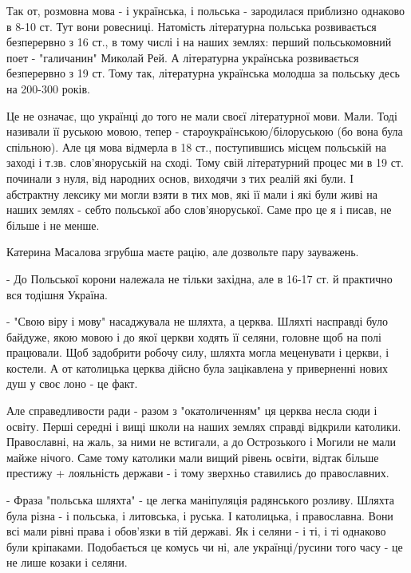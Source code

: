 \begin{itemize}
\begin{itemize}
Так от, розмовна мова - і українська, і польська - зародилася приблизно
однаково в 8-10 ст. Тут вони ровесниці. Натомість літературна польська
розвивається безперервно з 16 ст., в тому числі і на наших землях: перший
польськомовний поет - "галичанин" Миколай Рей. А літературна українська
розвивається безперервно з 19 ст. Тому так, літературна українська молодша за
польську десь на 200-300 років.

Це не означає, що українці до того не мали своєї літературної мови. Мали. Тоді
називали її руською мовою, тепер - староукраїнською/білоруською (бо вона була
спільною). Але ця мова відмерла в 18 ст., поступившись місцем польській на
заході і т.зв. слов'яноруській на сході. Тому свій літературний процес ми в 19
ст. починали з нуля, від народних основ, виходячи з тих реалій які були. І
абстрактну лексику ми могли взяти в тих мов, які її мали і які були живі на
наших землях - себто польської або слов'яноруської. Саме про це я і писав, не
більше і не менше.


 
Катерина Масалова згрубша маєте рацію, але дозвольте пару зауважень.

- До Польської корони належала не тільки західна, але в 16-17 ст. й практично вся тодішня Україна.

- "Свою віру і мову" насаджувала не шляхта, а церква. Шляхті насправді було
байдуже, якою мовою і до якої церкви ходять її селяни, головне щоб на полі
працювали. Щоб задобрити робочу силу, шляхта могла меценувати і церкви, і
костели. А от католицька церква дійсно була зацікавлена у приверненні нових душ
у своє лоно - це факт.

Але справедливости ради - разом з "окатоличенням" ця церква несла сюди і
освіту. Перші середні і вищі школи на наших землях справді відкрили католики.
Православні, на жаль, за ними не встигали, а до Острозького і Могили не мали
майже нічого. Саме тому католики мали вищий рівень освіти, відтак більше
престижу + лояльність держави - і тому зверхньо ставились до православних.

- Фраза "польська шляхта" - це легка маніпуляція радянського розливу. Шляхта
була різна - і польська, і литовська, і руська. І католицька, і православна.
Вони всі мали рівні права і обов'язки в тій державі. Як і селяни - і ті, і ті
однаково були кріпаками. Подобається це комусь чи ні, але українці/русини того
часу - це не лише козаки і селяни.


\end{itemize}
\end{itemize}
